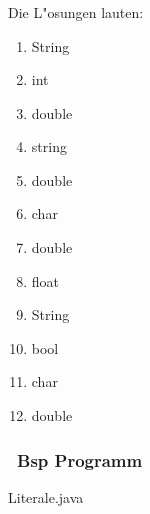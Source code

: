 \begin{frame}[fragile]%
  \frametitle{\stitle}%


Die L"osungen lauten:

\begin{center}

\begin{minipage}{0.3\textwidth}
\begin{enumerate}
\item{ \rightarrow String}\\
\item{ \rightarrow int}\\
\item{ \rightarrow double}\\
\item{ \rightarrow string}\\
\end{enumerate}
\end{minipage}
\hfill
\begin{minipage}{0.3\textwidth}
\begin{enumerate}
\setcounter{enumi}{4}
\item{ \rightarrow double}\\
\item{ \rightarrow char}\\
\item{ \rightarrow double}\\
\item{ \rightarrow float}\\
\end{enumerate}
\end{minipage}
\hfill
\begin{minipage}{0.3\textwidth}
\begin{enumerate}
\setcounter{enumi}{8}
\item{ \rightarrow String}\\
\item{ \rightarrow bool}\\
\item{ \rightarrow char}\\
\item{ \rightarrow double}\\
\end{enumerate}
\end{minipage}

\end{center}
\end{frame}


\begin{frame}[t]%
  \frametitle{\stitle\, Bsp Programm}%


{\getexercisefolder Literale.java}
\end{frame}
